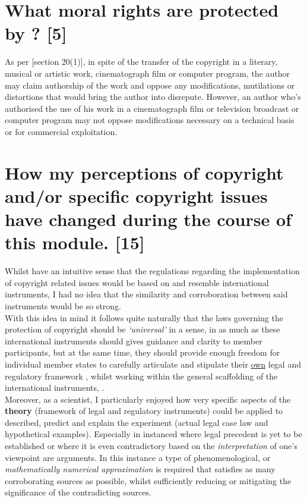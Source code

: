 \documentclass[11pt]{article}
\begin{document}
\section{What moral rights are protected by ? [5]}
\label{sec:org2d9215c}
As per [section 20(1)]\cite{rsa78_copyrightact}, in spite of the transfer of the
copyright in a literary, musical or artistic work, cinematograph film or
computer program, the author may claim authorship of the work and oppose any
modifications, mutilations or distortions that would bring the author into
disrepute. However, an author who's authorised the use of his work in a
cinematograph film or television broadcast or computer program may not oppose
modifications necessary on a technical basis or for commercial exploitation.

\section{How my perceptions of copyright and/or specific copyright issues have changed during the course of this module. [15]}
\label{sec:org9e99675}
Whilst have an intuitive sense that the regulations regarding the implementation of copyright related issues would be
based on and resemble international instruments, I had no idea that the similarity and corroboration between said
instruments would be so strong.\\

With this idea in mind it follows quite naturally that the laws governing the protection of copyright should be
\emph{`universal'} in a sense, in as much as these international instruments should gives guidance and clarity to member
participants, but at the same time, they should provide enough freedom for individual member states to carefully articulate
and stipulate their \uline{own} legal and regulatory framework \cite{rsa78_copyrightact}, whilst working within the general scaffolding of the
international instruments, \cite{wipo83_paris_conve_protect_ip,wipo96_model_provi_unfair_comp,wipo96_copyright_treaty,wipo86_berne}.\\

Moreover, as a scientist, I particularly enjoyed how very specific aspects of the \textbf{theory} (framework of legal and
regulatory instruments) could be applied to described, predict and explain the experiment (actual legal case law and
hypothetical examples). Especially in instanced where legal precedent is yet to be established or where it is even
contradictory based on the \emph{interpretation} of one's viewpoint are arguments. In this instance a type of
phenomenological, or \emph{mathematically numerical approximation} is required that satisfies as many corroborating sources
as possible, whilst sufficiently reducing or mitigating the significance of the contradicting sources.
\printbibliography
\end{document}
